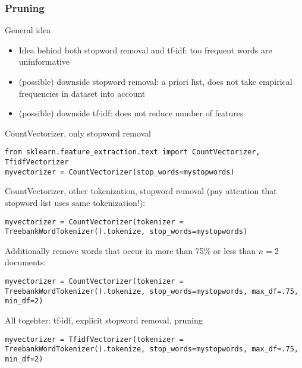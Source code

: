 \subsubsection{Pruning}

\begin{frame}{General idea}
\begin{itemize}
	\item Idea behind both stopword removal and tf$\cdot$idf: too frequent words are uninformative
	\item<2-> (possible) downside stopword removal: a priori list, does not take empirical frequencies in dataset into account
	\item<3-> (possible) downside tf$\cdot$idf: does not reduce number of features
\end{itemize}

\end{frame}

\begin{frame}
CountVectorizer, only stopword removal
\begin{lstlisting}
from sklearn.feature_extraction.text import CountVectorizer, TfidfVectorizer
myvectorizer = CountVectorizer(stop_words=mystopwords)
\end{lstlisting}

CountVectorizer, other tokenization, stopword removal (pay attention that stopword list uses same tokenization!):
\begin{lstlisting}
myvectorizer = CountVectorizer(tokenizer = TreebankWordTokenizer().tokenize, stop_words=mystopwords)
\end{lstlisting}

Additionally remove words that occur in more than 75\% or less than $n=2$ documents:
\begin{lstlisting}
myvectorizer = CountVectorizer(tokenizer = TreebankWordTokenizer().tokenize, stop_words=mystopwords, max_df=.75, min_df=2)
\end{lstlisting}

All togehter: tf$\cdot$idf, explicit stopword removal, pruning
\begin{lstlisting}
myvectorizer = TfidfVectorizer(tokenizer = TreebankWordTokenizer().tokenize, stop_words=mystopwords, max_df=.75, min_df=2)
\end{lstlisting}


\end{frame}


